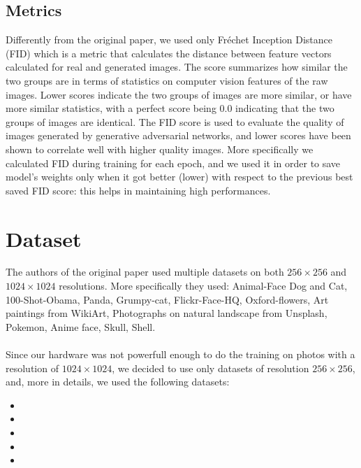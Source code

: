 \documentclass[12pt]{article}
\begin{document}
\subsection{Metrics}

Differently from the original paper, we used only Fréchet Inception Distance (FID) which
is a metric that calculates the distance between feature vectors calculated for real and 
generated images.
The score summarizes how similar the two groups are in terms of statistics on computer vision 
features of the raw images. Lower scores indicate the two groups of images are more similar, 
or have more similar statistics, with a perfect score being 0.0 indicating that the two 
groups of images are identical. The FID score is used to evaluate the quality of images 
generated by generative adversarial networks, and lower scores have been shown to correlate 
well with higher quality images. 
More specifically we calculated FID during training for each epoch, and we used it in order to
save model's weights only when it got better (lower) with respect to the previous best saved FID score:
this helps in maintaining high performances. 



\section{Dataset}
\large
The authors of the original paper used multiple datasets on both $256 \times 256$ and $1024 \times 1024$ resolutions. More specifically
they used: Animal-Face Dog and Cat, 100-Shot-Obama, Panda, Grumpy-cat, Flickr-Face-HQ, 
Oxford-flowers, Art paintings from WikiArt, Photographs on natural landscape from Unsplash, 
Pokemon, Anime face, Skull, Shell.\\\\ 
Since our hardware was not powerfull enough to do the training on photos with a resolution of $1024 \times 1024$, we decided to use only
datasets of resolution $256 \times 256$, and, more in details, we used the following datasets: 
\begin{itemize}
	\item {			 

	}
	\item {

	}
	\item {

	}
	\item {

	}
	\item {

	}
\end{itemize}
\end{document}
